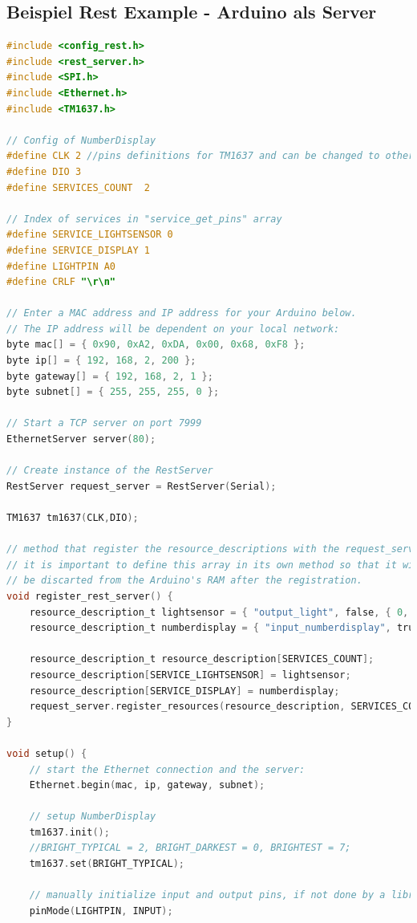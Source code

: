 \subsection{Beispiel Rest Example - Arduino als Server}
\begin{lstlisting}[language=C]
#include <config_rest.h>
#include <rest_server.h>
#include <SPI.h>
#include <Ethernet.h>
#include <TM1637.h>

// Config of NumberDisplay
#define CLK 2 //pins definitions for TM1637 and can be changed to other ports       
#define DIO 3
#define SERVICES_COUNT  2

// Index of services in "service_get_pins" array
#define SERVICE_LIGHTSENSOR 0
#define SERVICE_DISPLAY 1
#define LIGHTPIN A0
#define CRLF "\r\n"

// Enter a MAC address and IP address for your Arduino below.
// The IP address will be dependent on your local network:
byte mac[] = { 0x90, 0xA2, 0xDA, 0x00, 0x68, 0xF8 };
byte ip[] = { 192, 168, 2, 200 };
byte gateway[] = { 192, 168, 2, 1 };
byte subnet[] = { 255, 255, 255, 0 };

// Start a TCP server on port 7999
EthernetServer server(80);

// Create instance of the RestServer
RestServer request_server = RestServer(Serial);

TM1637 tm1637(CLK,DIO);

// method that register the resource_descriptions with the request_server
// it is important to define this array in its own method so that it will
// be discarted from the Arduino's RAM after the registration.
void register_rest_server() {
	resource_description_t lightsensor = { "output_light", false, { 0, 1023 } };
	resource_description_t numberdisplay = { "input_numberdisplay", true, { 0, 9999 } };
	
	resource_description_t resource_description[SERVICES_COUNT];
	resource_description[SERVICE_LIGHTSENSOR] = lightsensor;
	resource_description[SERVICE_DISPLAY] = numberdisplay;
	request_server.register_resources(resource_description, SERVICES_COUNT);
}

void setup() {
	// start the Ethernet connection and the server:
	Ethernet.begin(mac, ip, gateway, subnet);
	
	// setup NumberDisplay
	tm1637.init();
	//BRIGHT_TYPICAL = 2, BRIGHT_DARKEST = 0, BRIGHTEST = 7;
	tm1637.set(BRIGHT_TYPICAL); 
	
	// manually initialize input and output pins, if not done by a library
	pinMode(LIGHTPIN, INPUT);
	

\end{lstlisting}
